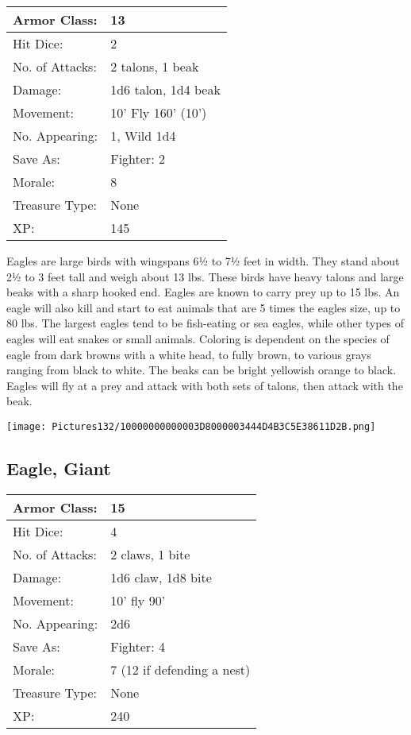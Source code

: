 \documentclass[a4paper,twoside,openany,10pt]{book}
\begin{document}
\begin{multicols}{2}
\begin{tabularx}{0.48\textwidth}{@{}lX@{}}
Armor Class: & 13 \\\hline
Hit Dice: & 2 \\\hline
No. of Attacks: & 2 talons, 1 beak \\\hline
Damage: & 1d6 talon, 1d4 beak \\\hline
Movement: & 10' Fly 160' (10') \\\hline
No. Appearing: & 1, Wild 1d4 \\\hline
Save As: & Fighter: 2 \\\hline
Morale: & 8 \\\hline
Treasure Type: & None \\\hline
XP: & 145 \\\hline
\end{tabularx}\medskip

Eagles
are large birds with wingspans 6½ to 7½ feet in width. They stand about 2½ to 3 feet tall and weigh about 13 lbs. These birds have heavy talons and large beaks with a sharp hooked end. Eagles are known to carry prey up to 15 lbs. An eagle will also kill and start to eat animals that are 5 times the eagles size, up to 80 lbs. The largest eagles tend to be fish-eating or sea eagles, while other types of eagles will eat snakes or small animals. Coloring is dependent on the species of eagle from dark browns with a white head, to fully brown, to various grays ranging from black to white. The beaks can be bright yellowish orange to black. Eagles will fly at a prey and attack with both sets of talons, then attack with the beak.

\begin{center}
	\texttt{[image: Pictures132/10000000000003D8000003444D4B3C5E38611D2B.png]}
\end{center}

\subsection*{Eagle, Giant}\label{eagle-giant}

\begin{tabularx}{0.48\textwidth}{@{}lX@{}}
Armor Class: & 15 \\\hline
Hit Dice: & 4 \\\hline
No. of Attacks: & 2 claws, 1 bite \\\hline
Damage: & 1d6 claw, 1d8 bite \\\hline
Movement: & 10' fly 90' \\\hline
No. Appearing: & 2d6 \\\hline
Save As: & Fighter: 4 \\\hline
Morale: & 7 (12 if defending a nest) \\\hline
Treasure Type: & None \\\hline
XP: & 240 \\\hline
\end{tabularx}\medskip


\end{multicols}
\end{document}
